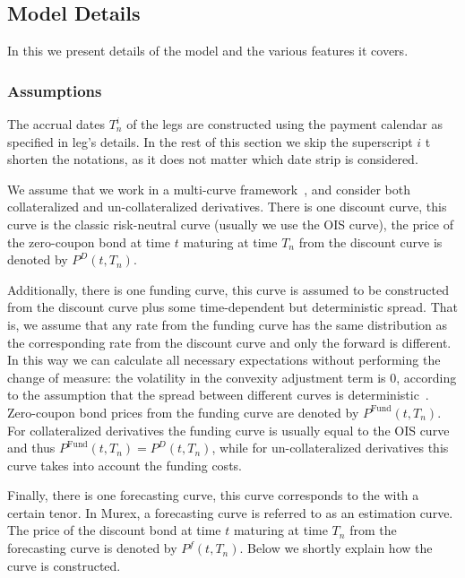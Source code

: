 \documentclass[]{pmv_report} %
\begin{document}


\subsection{Model Details}
In this we present details of the model and the various features it covers.

\subsubsection{Assumptions}
The accrual dates $T_n^i$ of the legs are constructed using the payment calendar as specified in leg's details.
In the rest of this section we skip the superscript $i$ t shorten the notations, as it does not matter which date strip is considered.

We assume that we work in a multi-curve framework~\cite{Mx.CurveAnalytics}, and consider both collateralized and un-collateralized derivatives.
There is one discount curve, this curve is the classic risk-neutral curve (usually we use the OIS curve), the price of the zero-coupon bond at time $t$ maturing at time $T_n$ from the discount curve is
denoted by $P^D(t,T_n)$.

Additionally, there is one funding curve, this curve is assumed to be constructed from the discount curve plus some time-dependent but deterministic spread.
That is, we assume that any rate from the funding curve has the same distribution as the corresponding rate from the discount curve and only the forward is different.
In this way we can calculate all necessary expectations without performing the change of measure: the volatility in the convexity adjustment term is $0$, according to the assumption that the spread between
different curves is deterministic~\cite{Mx.RateCurve}.
Zero-coupon bond prices from the funding curve are denoted by $P^{\text{Fund}}(t,T_n)$. For collateralized derivatives the funding curve is usually equal to the OIS curve and thus $P^{\text{Fund}}(t,T_n)=P^D(t,T_n)$, while for un-collateralized derivatives this curve takes into account the funding costs.

Finally, there is one forecasting curve, this curve corresponds to the \Libor with a certain tenor.
In Murex, a forecasting curve is referred to as an estimation curve.
The price of the discount bond at time $t$ maturing at time $T_n$ from the forecasting curve is denoted by $P^f(t,T_n)$.
Below we shortly explain how the curve is constructed.
\end{document}
